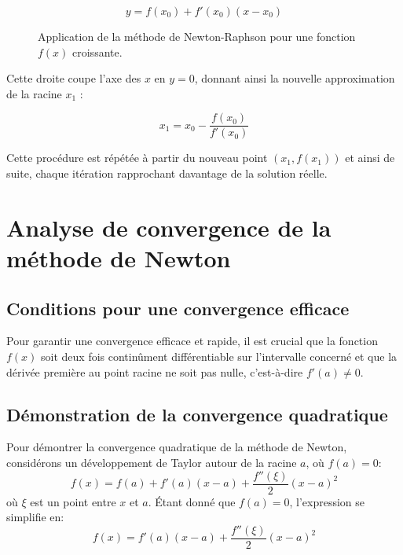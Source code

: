 \documentclass{article}
\begin{document}
\[ y = f(x_0) + f'(x_0)(x - x_0) \]

\begin{figure}[h!]
\caption{Application de la méthode de Newton-Raphson pour une fonction  \( f(x) \) croissante.}
\end{figure}
Cette droite coupe l'axe des \( x \) en \( y = 0 \), donnant ainsi la nouvelle approximation de la racine \( x_1 \) :

\[ x_1 = x_0 - \frac{f(x_0)}{f'(x_0)} \]

Cette procédure est répétée à partir du nouveau point \((x_1, f(x_1))\) et ainsi de suite, chaque itération rapprochant davantage de la solution réelle.


\section{Analyse de convergence de la méthode de Newton}

\subsection{Conditions pour une convergence efficace}
Pour garantir une convergence efficace et rapide, il est crucial que la fonction \( f(x) \) soit deux fois continûment différentiable sur l'intervalle concerné et que la dérivée première au point racine ne soit pas nulle, c’est-à-dire \( f'(a) \neq 0 \).

\subsection{Démonstration de la convergence quadratique}
Pour démontrer la convergence quadratique de la méthode de Newton, considérons un développement de Taylor autour de la racine \( a \), où \( f(a) = 0 \):
\[ f(x) = f(a) + f'(a)(x - a) + \frac{f''(\xi)}{2}(x - a)^2 \]
où \( \xi \) est un point entre \( x \) et \( a \). Étant donné que \( f(a) = 0 \), l'expression se simplifie en:
\[ f(x) = f'(a)(x - a) + \frac{f''(\xi)}{2}(x - a)^2 \]
\end{document}
